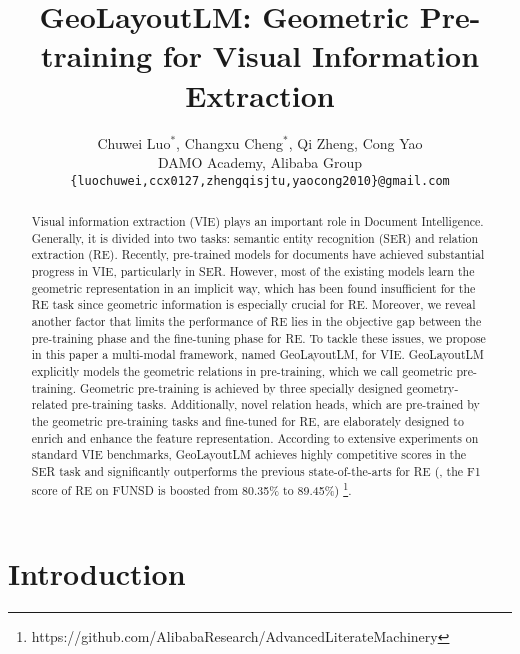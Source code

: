 \documentclass[10pt,twocolumn,letterpaper]{article}
\begin{document}
\title{GeoLayoutLM: Geometric Pre-training for Visual Information Extraction}

\author{
Chuwei Luo$^*$, 
Changxu Cheng$^*$, 
Qi Zheng, 
Cong Yao \\
DAMO Academy, Alibaba Group\\
{\tt\small \{luochuwei,ccx0127,zhengqisjtu,yaocong2010\}@gmail.com}
}
\maketitle
\def\thefootnote{*}
\def\thefootnote{\arabic{footnote}}


\begin{abstract}
  Visual information extraction (VIE) plays an important role in Document Intelligence. Generally, it is divided into two tasks: semantic entity recognition (SER) and relation extraction (RE). Recently, pre-trained models for documents have achieved substantial progress in VIE, particularly in SER. However, most of the existing models learn the geometric representation in an implicit way, which has been found insufficient for the RE task since geometric information is especially crucial for RE. Moreover, we reveal another factor that limits the performance of RE lies in the objective gap between the pre-training phase and the fine-tuning phase for RE. To tackle these issues, we propose in this paper a multi-modal framework, named GeoLayoutLM, for VIE. GeoLayoutLM explicitly models the geometric relations in pre-training, which we call geometric pre-training. Geometric pre-training is achieved by three specially designed geometry-related pre-training tasks. Additionally, novel relation heads, which are pre-trained by the geometric pre-training tasks and fine-tuned for RE, are elaborately designed to enrich and enhance the feature representation.
  According to extensive experiments on standard VIE benchmarks, GeoLayoutLM achieves highly competitive scores in the SER task and significantly outperforms the previous state-of-the-arts for RE (\eg, the F1 score of RE on FUNSD is boosted from 80.35\% to 89.45\%)
  \footnote{https://github.com/AlibabaResearch/AdvancedLiterateMachinery}.
\end{abstract}

\section{Introduction}
\label{sec:intro}
\end{document}
